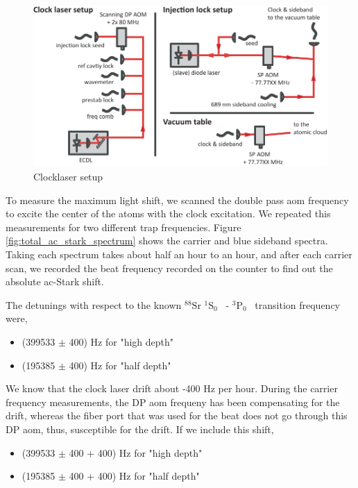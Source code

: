 \documentclass[bibnotes]{article}
\newcommand{\SLJ}[3]{{\ensuremath{{^{#1}}\mathrm{#2}_{#3}}}}
\newcommand{\TPZ}{\SLJ{3}{P}{0} \ }
\newcommand{\SSZ}{\SLJ{1}{S}{0} \ }
\begin{document}
		\begin{figure}
		    \centering
		    \includegraphics[scale=0.8]{figures/clocklaser_setup.pdf}
		    \caption{Clocklaser setup}
		    \label{fig:clocklaser setup}
		\end{figure}

			To measure the maximum light shift, we scanned the double pass aom frequency to excite the center of the atoms with the clock excitation. We repeated this measurements for two different trap frequencies. Figure \ref{fig:total_ac_stark_spectrum} shows the carrier and blue sideband spectra. Taking each spectrum takes about half an hour to an hour, and after each carrier scan, we recorded the beat frequency recorded on the counter to find out the absolute ac-Stark shift.

			The detunings with respect to the known $^{\text{88}}{\text{Sr}}$ \SSZ - \TPZ transition frequency~\cite{sansonetti10} were,


			\begin{itemize}
			  \item (399533 $\pm$ 400) Hz for "high depth"
			  \item (195385 $\pm$ 400) Hz for "half depth"
			\end{itemize}


			We know that the clock laser drift about -400 Hz per hour. During the carrier frequency measurements, the DP aom frequeny has been compensating for the drift, whereas the fiber port that was used for the beat does not go through this DP aom, thus, susceptible for the drift. If we include this shift, 

			\begin{itemize}
			  \item (399533 $\pm$ 400 + 400) Hz for "high depth"
			  \item (195385 $\pm$ 400 + 400) Hz for "half depth"
			\end{itemize}
\end{document}
